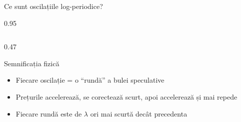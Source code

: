 \documentclass[9pt, aspectratio=169, t]{beamer}
\begin{document}
\begin{frame}{Ce sunt oscilațiile log-periodice?}
\begin{cminipage}{0.95\textwidth}
{\begin{columns}[T]
\begin{column}{0.47\textwidth}
            \begin{block}{Semnificația fizică}
                \begin{itemize}\setlength{\itemsep}{0pt}
                    \item Fiecare oscilație = o ``rundă'' a bulei speculative
                    \item Prețurile accelerează, se corectează scurt, apoi accelerează și mai repede
                    \item Fiecare rundă este de $\lambda$ ori mai scurtă decât precedenta
                \end{itemize}
            \end{block}
        \end{column}
    \end{columns}
    }
    \end{cminipage}
\end{frame}
\end{document}
